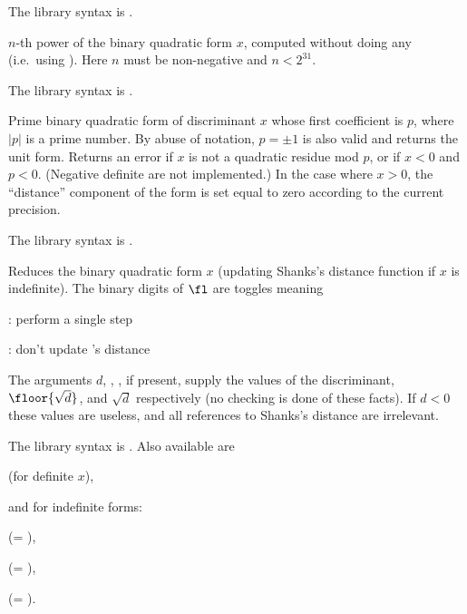 The library syntax is .

\label{se:qfbpowraw}
$n$-th power of the binary quadratic form
$x$, computed without doing any  (i.e.~using ).
Here $n$ must be non-negative and $n<2^{31}$.

The library syntax is .

\label{se:qfbprimeform}
Prime binary quadratic form of discriminant
$x$ whose first coefficient is $p$, where $|p|$ is a prime number.
By abuse of notation,
$p = \pm 1$ is also valid and returns the unit form. Returns an
error if $x$ is not a quadratic residue mod $p$, or if $x < 0$ and $p < 0$.
(Negative definite  are not implemented.) In the case where $x>0$,
the ``distance'' component of the form is set equal to zero according to the
current precision.

The library syntax is .

\label{se:qfbred}
Reduces the binary quadratic form $x$ (updating Shanks's distance function
if $x$ is indefinite). The binary digits of $\fl$ are toggles meaning

: perform a single  step

: don't update 's distance

The arguments $d$, , , if present, supply the values of the
discriminant, $\floor{\sqrt{d}}$, and $\sqrt{d}$ respectively
(no checking is done of these facts). If $d<0$ these values are useless,
and all references to Shanks's distance are irrelevant.

The library syntax is .
Also available are

 (for definite $x$),

\noindent and for indefinite forms:


 (= ),

 (= ),

 (= ).

